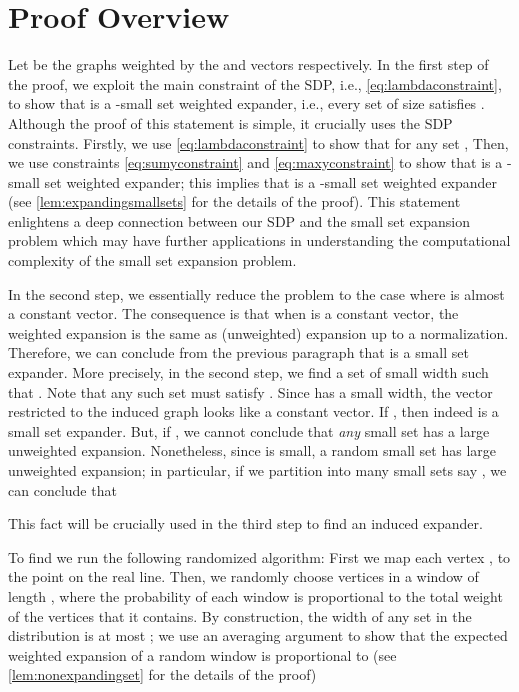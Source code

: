 \documentclass[11pt]{article}
\begin{document}
\section{Proof Overview}\label{sec:proofoverview}
Let  be the graphs weighted by the  and  vectors respectively. In the first step of the proof, we exploit the main constraint of the SDP, i.e., \eqref{eq:lambdaconstraint}, to show that  is a -small set  weighted expander, i.e., every set  of size   satisfies .
Although the proof of this statement is simple, it crucially uses the SDP constraints.
Firstly, we use \eqref{eq:lambdaconstraint} to show that for any set ,  Then, we use constraints \eqref{eq:sumyconstraint} and \eqref{eq:maxyconstraint} to show that  is a -small set  weighted expander; this implies that  is a -small set weighted expander (see \autoref{lem:expandingsmallsets} for the details of the proof). 
This statement  enlightens  a deep connection between our SDP and the small set expansion problem which may have further applications in understanding the computational complexity of the small set expansion problem. 

In the second step, we  essentially reduce the problem to the case where  is almost a constant vector. 
The consequence is that when  is a constant vector,  the weighted expansion is the same as (unweighted) expansion up to a normalization. Therefore,  we can conclude from the previous paragraph that  is a small set expander.
More precisely, in the second step, we find a set  of small width such that . Note that any such set must satisfy . Since  has a small width, the  vector restricted to the induced graph  looks like a constant vector. 
If , then indeed  is a small set expander. 
But, if , we cannot conclude that \emph{any} small set  has a large unweighted expansion. 
Nonetheless, since  is small, a random small set has large unweighted expansion; in particular, if we partition  into many small sets say , we can conclude that 

This fact will be crucially used in the third step to find an induced expander.


To find   we run the following randomized algorithm: First we map each vertex , to the point  on the real line. Then, we randomly choose vertices in a window of length , where the probability of each window is proportional to the total weight of the vertices that it contains.  By construction, the width of any set in the distribution is at most ; we use an averaging argument to show that the expected weighted expansion of a random window is proportional to  (see \autoref{lem:nonexpandingset} for the details of the proof)
\end{document}
